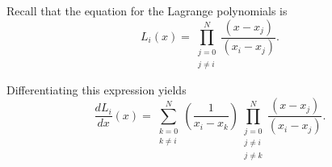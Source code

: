 \documentclass[10pt]{article}
\newcommand{\be}{\begin{equation}}
\newcommand{\ee}{\end{equation}}
\begin{document}
Recall that the equation for the Lagrange polynomials is
\be
L_i(x)=\prod_{\substack{ j=0  \\ j\neq i }}^N \frac{ (x - x_j) }{ (x_i - x_j) }.
\ee

Differentiating this expression yields
\be
\frac{dL_i}{dx} (x)=\sum_{\substack{ k=0  \\ k \neq i}}^N \left( \frac{1}{x_i - x_k} \right) \prod_{\substack{ j=0  \\ j\neq i \\ j \neq k }}^N \frac{ (x - x_j) }{ (x_i - x_j) }.
\ee
\end{document}
